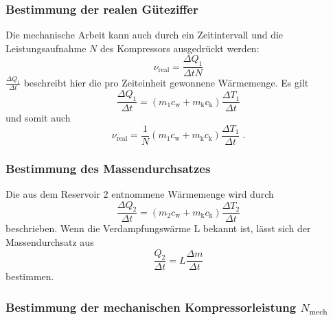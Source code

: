 \subsubsection{Bestimmung der realen Güteziffer}

    Die mechanische Arbeit kann auch durch ein Zeitintervall und die Leistungsaufnahme $N$ des Kompressors ausgedrückt werden:
    \begin{equation}
        \nu_\text{real} = \frac{\Delta Q_1}{\Delta t N}
    \end{equation}
    $\frac{\Delta Q_1}{\Delta t}$ beschreibt hier die pro Zeiteinheit gewonnene Wärmemenge. Es gilt
    \begin{equation}
        \frac{\Delta Q_1}{\Delta t} = (m_1 c_\text{w} + m_\text{k} c_\text{k}) \frac{\Delta T_1}{\Delta t}
    \end{equation}
    und somit auch
    \begin{equation}
      \label{eqn:reale_gueteziffer}
      \nu_\text{real} = \frac{1}{N} (m_1 c_\text{w} + m_\text{k} c_\text{k}) \frac{\Delta T_1}{\Delta t} \; .
    \end{equation}

\subsubsection{Bestimmung des Massendurchsatzes}

    Die aus dem Reservoir 2 entnommene Wärmemenge wird durch
    \begin{equation}
        \frac{\Delta Q_2}{\Delta t} =(m_2 c_\text{w} + m_\text{k} c_\text{k}) \frac{\Delta T_2}{\Delta t}
    \end{equation}
    beschrieben.
    Wenn die Verdampfungswärme L bekannt ist, lässt sich der Massendurchsatz aus
    \begin{equation}
        \frac{Q_2}{\Delta t} = L \frac{\Delta m}{\Delta t}
    \end{equation}
    bestimmen.

\subsubsection{Bestimmung der mechanischen Kompressorleistung $N_\text{mech}$}

